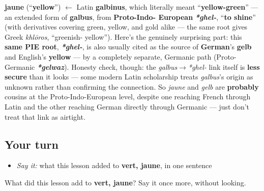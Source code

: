 \begin{cousinweb}
\textbf{jaune} (\textquotedblleft{}\textbf{yellow}\textquotedblright{}) $\leftarrow$ Latin \textbf{galbinus}, which literally meant \textquotedblleft{}\textbf{yellow-green}\textquotedblright{} — an extended form of \textbf{galbus}, from \textbf{Proto-Indo- European} \emph{\textbf{*ghel-}}, \textquotedblleft{}\textbf{to shine}\textquotedblright{} (with derivatives covering green, yellow, and gold alike — the same root gives Greek \emph{khlōros}, \textquotedblleft{}greenish- yellow\textquotedblright{}). Here's the genuinely surprising part: this \textbf{same PIE root}, \emph{\textbf{*ghel-}}, is also usually cited as the source of \textbf{German}'s \textbf{gelb} and English's \textbf{yellow} — by a completely separate, Germanic path (Proto- Germanic \emph{\textbf{*gelwaz}}). Honesty check, though: the \emph{galbus}$\to$\emph{*ghel-} link itself is \textbf{less secure} than it looks — some modern Latin scholarship treats \emph{galbus}'s origin as unknown rather than confirming the connection. So \emph{jaune} and \emph{gelb} are \textbf{probably} cousins at the Proto-Indo-European level, despite one reaching French through Latin and the other reaching German directly through Germanic — just don't treat that link as airtight.
\end{cousinweb}

\subsection*{Your turn}
\begin{itemize}
\raggedright
  \item \emph{Say it:} what this lesson added to \textbf{vert, jaune}, in one sentence
\end{itemize}

\begin{tcolorbox}[breakable,colback=teal!4,colframe=teal!35!black,title={Before you move on}]
What did this lesson add to \textbf{vert, jaune}? Say it once more, without looking.
\end{tcolorbox}
